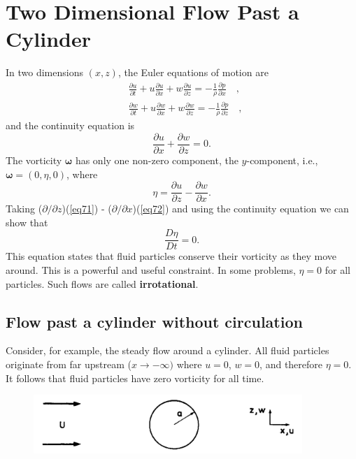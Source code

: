 \documentclass[10pt]{report}
\begin{document}
\chapter{Two Dimensional Flow Past a Cylinder}
In two dimensions $(x, z)$, the Euler equations of motion are
\begin{align}
& \frac{\partial u}{\partial t}+u\frac{\partial u}{\partial
x}+w\frac{\partial u}{\partial z}=-\frac{1}{\rho }\frac{\partial
p}{\partial x}\quad , \label{eq71} \\
& \frac{\partial w}{\partial t}+u\frac{\partial w}{\partial
x}+w\frac{\partial w}{\partial z}=-\frac{1}{\rho }\frac{\partial
p}{\partial z}\quad , \label{eq72}
\end{align}
and the continuity equation is
\begin{equation}
\label{eq73}
\frac{\partial u}{\partial x}+\frac{\partial w}{\partial z}=0 .
\end{equation}
The vorticity ${\bm\omega}$ has only one non-zero component, the
$y$-component, i.e., ${\bm\omega}= (0, \eta , 0)$, where
\begin{equation}
\label{eq74}
\eta =\frac{\partial u}{\partial z}-\frac{\partial w}{\partial x}.
\end{equation}
Taking ($\partial /\partial z$)(\ref{eq71}) - ($\partial /\partial x$)(\ref{eq72}) and
using the continuity equation we can show that
\begin{equation}
\label{eq75}
\frac{D\eta }{Dt}=0.
\end{equation}
This equation states that fluid particles conserve their vorticity as they
move around. This is a powerful and useful constraint. In some problems,
$\eta  = 0$ for all particles. Such flows are called \textbf{irrotational}.

\section{Flow past a cylinder without circulation}
Consider, for example, the steady flow around a cylinder.  All fluid particles originate from far upstream ($x
\to -\infty )$ where $u = 0$, $w = 0$,
and therefore $\eta  = 0$. It follows that fluid particles have zero
vorticity for all time.

\begin{figure}[htbp]
\centerline{\includegraphics[width=4in]{Section71.pdf}}
\caption{ }
\label{fig4.1}
\end{figure}
\end{document}
